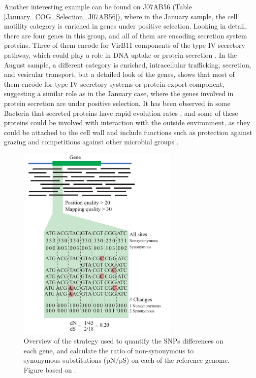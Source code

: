 Another interesting example can be found on J07AB56 (Table \ref{January_COG_Selection_J07AB56}), where in the January sample, the cell motility category is enriched in genes under positive selection. Looking in detail, there are four genes in this group, and all of them are encoding secretion system proteins. Three of them encode for VirB11 components of the type IV secretory pathway, which could play a role in DNA uptake or protein secretion \cite{Chandran:2009fg}. In the August sample, a different category is enriched, intracellular trafficking, secretion, and vesicular transport, but a detailed look of the genes, shows that most of them encode for type IV secretory systems or protein export component, suggesting a similar role as in the January case, where the genes involved in protein secretion are under positive selection. It has been observed in some Bacteria that secreted proteins have rapid evolution rates \cite{Nogueira:2012gv}, and some of these proteins could be involved with interaction with the outside environment, as they could be attached to the cell wall and include functions such as protection against grazing \cite{Matz:2005ik} and competitions against other microbial groups \cite{Kirkup:2004hj}.


\begin{figure}[!hbtp]
  \centering
  \includegraphics[width=0.7\textwidth]{Chapter5/Figures/MappingStrategy.pdf}
  \caption{Overview of the strategy used to quantify the SNPs differences on each gene, and calculate the ratio of non-synonymous to synonymous substitutions (pN/pS) on each of the reference genome. Figure based on \cite{Tai:2011jo}.}
  \label{MappingStrategy}
\end{figure}

